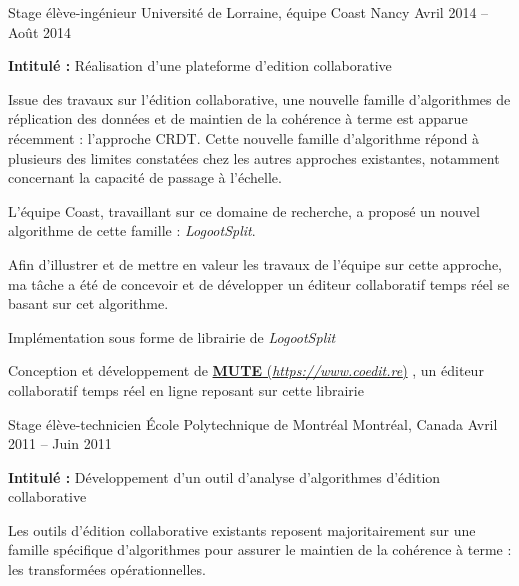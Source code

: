 \documentclass[12pt, a4paper]{awesome-cv}
\newcommand{\customlink}[2]{
  \href{#2}{\textbf{#1} (\emph{#2})}
}
\begin{document}
\begin{cventries}
\cventry
  {Stage élève-ingénieur} %
  {Université de Lorraine, équipe Coast} %
  {Nancy} %
  {Avril 2014 – Août 2014} %
  {
    \begin{cvitems} %
      \item {\textbf{Intitulé :}  Réalisation d’une plateforme d’edition collaborative}
    \end{cvitems}
  }

  \begin{cvparagraph}
    Issue des travaux sur l'édition collaborative, une nouvelle famille d'algorithmes de réplication des données et de maintien de la cohérence à terme est apparue récemment : l'approche \acf{CRDT}.
    Cette nouvelle famille d'algorithme répond à plusieurs des limites constatées chez les autres approches existantes, notamment concernant la capacité de passage à l'échelle.

    L'équipe Coast, travaillant sur ce domaine de recherche, a proposé un nouvel algorithme de cette famille : \emph{LogootSplit}.

    Afin d'illustrer et de mettre en valeur les travaux de l'équipe sur cette approche,
    ma tâche a été de concevoir et de développer un éditeur collaboratif temps réel se basant sur cet algorithme.

    \begin{tightemize}
      \item Implémentation sous forme de librairie de \emph{LogootSplit}
      \item Conception et développement de \customlink{MUTE}{https://www.coedit.re}, un éditeur collaboratif temps réel en ligne reposant sur cette librairie
    \end{tightemize}
  \end{cvparagraph}

\cventry
  {Stage élève-technicien} %
  {École Polytechnique de Montréal} %
  {Montréal, Canada} %
  {Avril 2011 – Juin 2011} %
  {
    \begin{cvitems} %
      \item {\textbf{Intitulé :}  Développement d’un outil d'analyse d'algorithmes d'édition collaborative}
    \end{cvitems}
  }

\begin{cvparagraph}
  Les outils d'édition collaborative existants reposent majoritairement sur une famille spécifique d'algorithmes pour assurer le maintien de la cohérence à terme : les transformées opérationnelles.


\end{cvparagraph}
\end{cventries}
\end{document}
